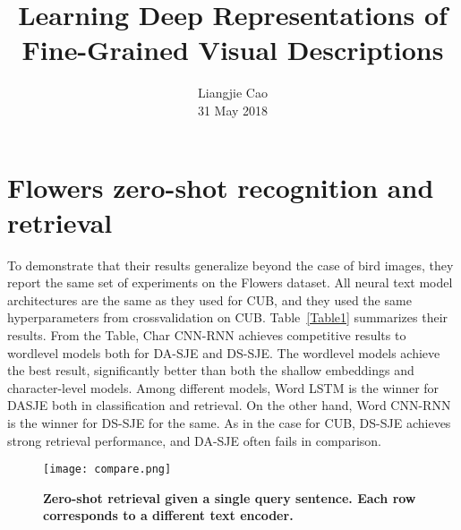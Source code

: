 \documentclass[10pt,twocolumn,letterpaper]{article}
\begin{document}
\title{\textbf{Learning Deep Representations of Fine-Grained Visual Descriptions}}
\author{Liangjie Cao\\31 May 2018}
\maketitle
\section{Flowers zero-shot recognition and retrieval}
To demonstrate that their results generalize beyond the case of bird images, they report the same set of experiments on the Flowers dataset. All neural text model architectures are the same as they used for CUB, and they used the same hyperparameters from crossvalidation on CUB. Table~\ref{Table1} summarizes their results. From the Table, Char CNN-RNN achieves competitive results to wordlevel models both for DA-SJE and DS-SJE. The wordlevel models achieve the best result, significantly better than both the shallow embeddings and character-level models. Among different models, Word LSTM is the winner for DASJE both in classification and retrieval. On the other hand, Word CNN-RNN is the winner for DS-SJE for the same. As in the case for CUB, DS-SJE achieves strong retrieval performance, and DA-SJE often fails in comparison.
\begin{figure}[!htb]
 \centering
 \texttt{[image: compare.png]}\\
 \caption{\textbf{Zero-shot retrieval given a single query sentence. Each row corresponds to a different text encoder.}}\label{Figure1}
 \end{figure}
\end{document}
